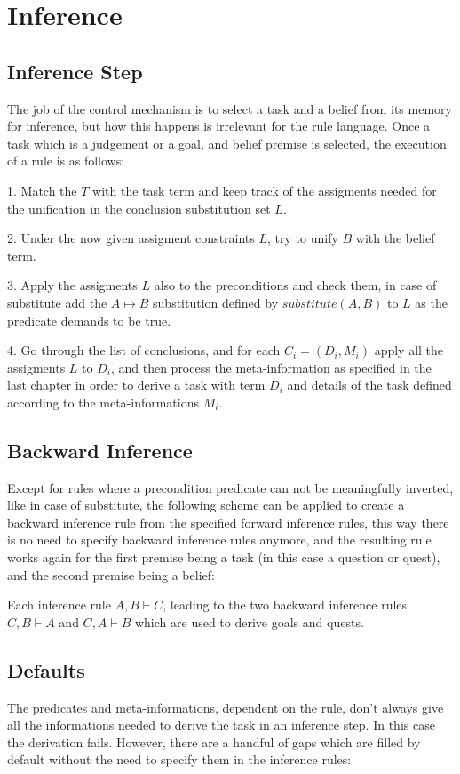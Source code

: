 \documentclass{article}
\begin{document}
\section{Inference}

\subsection{Inference Step}
The job of the control mechanism is to select a task and a belief from its memory for inference, but how this happens is irrelevant for the rule language.
Once a task which is a judgement or a goal, and belief premise is selected, the execution of a rule is as follows:

1. Match the $T$ with the task term and keep track of the assigments needed for the unification in the conclusion substitution set $L$.

2. Under the now given assigment constraints $L$, try to unify $B$ with the belief term.

3. Apply the assigments $L$ also to the preconditions and check them, in case of substitute add the $A \mapsto B$ substitution defined by $substitute(A,B)$ to $L$ as the predicate demands to be true.

4. Go through the list of conclusions, and for each $C_i=(D_i,M_i)$ apply all the assigments $L$ to $D_i$, and then process the meta-information as specified in the last chapter in order to derive a task with term $D_i$ and details of the task defined according to the meta-informations $M_i$.

\subsection{Backward Inference}

Except for rules where a precondition predicate can not be meaningfully inverted, like in case of substitute, the following scheme can be applied to create a backward inference rule from the specified forward inference rules, this way there is no need to specify backward inference rules anymore, and the resulting rule works again for the first premise being a task (in this case a question or quest), and the second premise being a belief:

Each inference rule $A, B \vdash C$, leading to the two backward inference rules
$C, B \vdash A$ and $C, A \vdash B$ which are used to derive goals and quests.

\subsection{Defaults}
The predicates and meta-informations, dependent on the rule, don't always give all the informations needed to derive the task in an inference step. In this case the derivation fails. However, there are a handful of gaps which are filled by default without the need to specify them in the inference rules:
\end{document}
